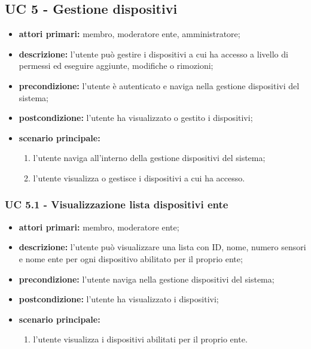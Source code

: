 	\subsection{UC 5 - Gestione dispositivi}

		\begin{itemize}
			\item \textbf{attori primari:} membro, moderatore ente, amministratore;
			\item \textbf{descrizione:} l'utente può gestire i dispositivi a cui ha accesso a livello di permessi ed eseguire aggiunte, modifiche o rimozioni;
			\item \textbf{precondizione:} l'utente è autenticato e naviga nella gestione dispositivi del sistema;
			\item \textbf{postcondizione:} l'utente ha visualizzato o gestito i dispositivi;
			\item \textbf{scenario principale:}
			\begin{enumerate}
				\item{l'utente naviga all'interno della gestione dispositivi del sistema;}
				\item{l'utente visualizza o gestisce i dispositivi a cui ha accesso.}
			\end{enumerate}
		\end{itemize}


			\subsubsection{UC 5.1 - Visualizzazione lista dispositivi ente}
			\begin{itemize}
				\item \textbf{attori primari:} membro, moderatore ente;
				\item \textbf{descrizione:} l'utente può visualizzare una lista con ID, nome, numero sensori e nome ente per ogni dispositivo abilitato per il proprio ente;
				\item \textbf{precondizione:} l'utente naviga nella gestione dispositivi del sistema;
				\item \textbf{postcondizione:} l'utente ha visualizzato i dispositivi;
				\item \textbf{scenario principale:}
				\begin{enumerate}
					\item{l'utente visualizza i dispositivi abilitati per il proprio ente.}
				\end{enumerate}
			\end{itemize}

